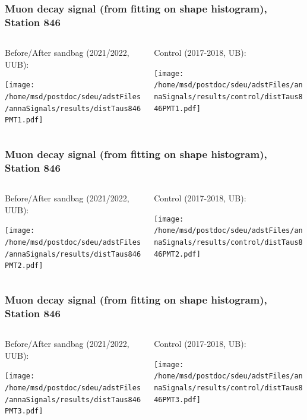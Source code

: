 \documentclass[aspectratio=169]{beamer}
\begin{document}
\begin{frame}
  \frametitle{Muon decay signal (from fitting on shape histogram), Station 846}
  
  \begin{columns}[T,c]
    \begin{column}{.5\textwidth}
      Before/After sandbag (2021/2022, UUB):
      \vspace{.3cm}

      \texttt{[image: /home/msd/postdoc/sdeu/adstFiles/annaSignals/results/distTaus846PMT1.pdf]}
    \end{column}
    \begin{column}{.5\textwidth}
      Control (2017-2018, UB):
      \vspace{0.3cm}

      \texttt{[image: /home/msd/postdoc/sdeu/adstFiles/annaSignals/results/control/distTaus846PMT1.pdf]}
    \end{column}
  \end{columns}
\end{frame}

\begin{frame}
  \frametitle{Muon decay signal (from fitting on shape histogram), Station 846}
  
  \begin{columns}[T,c]
    \begin{column}{.5\textwidth}
      Before/After sandbag (2021/2022, UUB):
      \vspace{.3cm}

      \texttt{[image: /home/msd/postdoc/sdeu/adstFiles/annaSignals/results/distTaus846PMT2.pdf]}
    \end{column}
    \begin{column}{.5\textwidth}
      Control (2017-2018, UB):
      \vspace{0.3cm}

      \texttt{[image: /home/msd/postdoc/sdeu/adstFiles/annaSignals/results/control/distTaus846PMT2.pdf]}
    \end{column}    
\end{columns}
\end{frame}

\begin{frame}
  \frametitle{Muon decay signal (from fitting on shape histogram), Station 846}
  
  \begin{columns}[T,c]
    \begin{column}{.5\textwidth}
      Before/After sandbag (2021/2022, UUB):
      \vspace{.3cm}

      \texttt{[image: /home/msd/postdoc/sdeu/adstFiles/annaSignals/results/distTaus846PMT3.pdf]}
    \end{column}
    \begin{column}{.5\textwidth}
      Control (2017-2018, UB):
      \vspace{0.3cm}

      \texttt{[image: /home/msd/postdoc/sdeu/adstFiles/annaSignals/results/control/distTaus846PMT3.pdf]}
    \end{column}    
\end{columns}
\end{frame}
\end{document}
